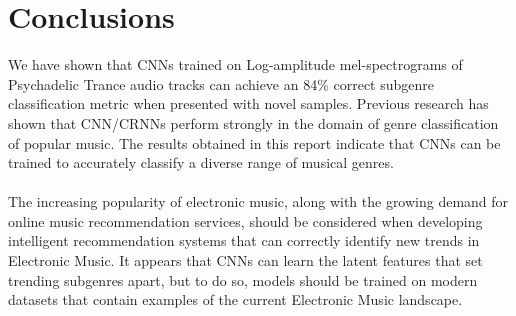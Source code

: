 \documentclass[12pt]{article}
\newcounter{ct}
\begin{document}
\section*{Conclusions}
We have shown that CNNs trained on 
Log-amplitude mel-spectrograms  
of Psychadelic Trance audio tracks can achieve an 84\% correct subgenre 
classification
metric when presented with novel samples. Previous research has
shown that CNN/CRNNs perform strongly in the domain of genre classification
of popular music. The results obtained in this report indicate that 
CNNs can be trained to accurately classify a diverse range of musical 
genres. 
\\\\
The increasing popularity of electronic music, along with the growing demand
for online music recommendation services, 
should be considered when developing intelligent 
recommendation systems that can correctly identify 
new trends in Electronic Music. It appears that CNNs can learn 
the latent features that set trending subgenres apart, but to do so, 
models should be trained on 
modern datasets that contain examples of the current Electronic Music 
landscape.
\clearpage
\end{document}
